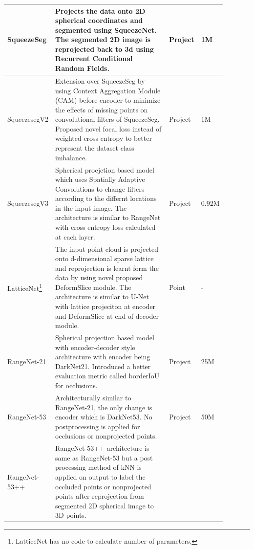 \begin{longtable}{|p{0.15\linewidth} | p{0.59\linewidth}| p{0.06\linewidth} |p{0.09\linewidth}|}
            \hline
            SqueezeSeg\cite{Sequeseseg_2018} &
            Projects the data onto 2D spherical coordinates and segmented using SqueezeNet.
            The segmented 2D image is reprojected back to 3d using Recurrent Conditional Random Fields.
            & Project & 1M \\
            \hline
            SqueezesegV2\cite{SqueezeSegv2} &
            Extension over SqueezeSeg by using Context Aggregation Module (CAM) before encoder to minimize the effects of missing points on convolutional filters of SqueezeSeg.
            Proposed novel focal loss instead of weighted cross entropy to better represent the dataset class imbalance.
            & Project & 1M \\
            \hline
            SqueezesegV3\cite{xu2020squeezesegv3} &
            Spherical proejction based model which uses Spatially Adaptive Convolutions to change filters according to the differnt locations in the input image.
            The architecture is similar to RangeNet with cross entropy loss calculated at each layer.
            & Project & 0.92M \\
            \hline
            LatticeNet\cite{rosu2019latticenet}\footnote{LatticeNet has no code to calculate number of parameters.} &
            The input point cloud is projected onto d-dimensional sparse lattice and reprojection is learnt form the data by using novel proposed DeformSlice module.
            The architecture is similar to U-Net with lattice projeciton at encoder and DeformSlice at end of decoder module.
            & Point & - \\
            \hline
            RangeNet-21\cite{Milioto2019} & 
            Spherical projection based model with encoder-decoder style architecture with encoder being DarkNet21.
            Introduced a better evaluation metric called borderIoU for occlusions.
            & Project & 25M \\
            \hline
            RangeNet-53\cite{Milioto2019}  & 
            Architecturally similar to RangeNet-21, the only change is encoder which is DarkNet53.
            No postprocessing is applied for occlusions or nonprojected points.
            & Project & 50M \\
            \hline
            RangeNet-53++\cite{Milioto2019} &
            RangeNet-53++ architecture is same as RangeNet-53 but a post processing 
            method of kNN is applied on output to label the occluded points or nonprojected points after reprojection from segmented 2D spherical image to 3D points.

\end{longtable}
